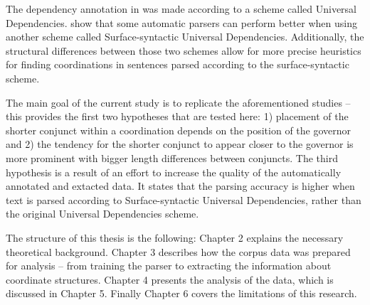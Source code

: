 The dependency annotation in \cite{pbg2023} was made according to a scheme called Universal Dependencies. \cite{tuo:prz:lac:21} show that some automatic parsers can perform better when using another scheme called Surface-syntactic Universal Dependencies. Additionally, the structural differences between those two schemes allow for more precise heuristics for finding coordinations in sentences parsed according to the surface-syntactic scheme.

The main goal of the current study is to replicate the aforementioned studies -- this provides the first two hypotheses that are tested here: 1) placement of the shorter conjunct within a coordination depends on the position of the governor and 2) the tendency for the shorter conjunct to appear closer to the governor is more prominent with bigger length differences between conjuncts. The third hypothesis is a result of an effort to increase the quality of the automatically annotated and extacted data. It states that the parsing accuracy is higher when text is parsed according to Surface-syntactic Universal Dependencies, rather than the original Universal Dependencies scheme.

The structure of this thesis is the following: Chapter 2 explains the necessary theoretical background. Chapter 3 describes how the corpus data was prepared for analysis -- from training the parser to extracting the information about coordinate structures. Chapter 4 presents the analysis of the data, which is discussed in Chapter 5. Finally Chapter 6 covers the limitations of this research. 